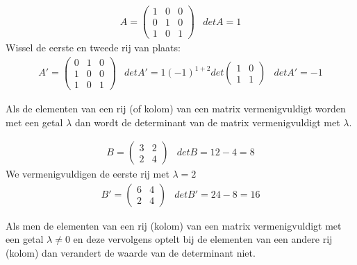 	
	\begin{voorbeeld}
		
	\[ \begin{array}{ll} A=\left( \begin{matrix}
	1 & 0 & 0 \\ 0 & 1 & 0 \\ 1 & 0 & 1
	\end{matrix} \right) & det A = 1 \end{array} \]
	Wissel de eerste en tweede rij van plaats:
	\[ \begin{array}{lll} A'=\left( \begin{matrix}
	0 & 1 & 0 \\ 1 & 0 & 0 \\ 1 & 0 & 1
	\end{matrix} \right) & det A'=1(-1)^{1+2}det \left( \begin{matrix} 1 & 0 \\ 1 & 1 \end{matrix} \right) & det A'=-1 \end{array} \]
	
	\end{voorbeeld}
\begin{eigenschap}
		Als de elementen van een rij (of kolom) van een matrix vermenigvuldigt worden met een getal $\lambda$ dan wordt de determinant van de matrix vermenigvuldigt met $\lambda$.
	\end{eigenschap}
	

	\begin{voorbeeld}
		
	\[ \begin{array}{ll} B=\left( \begin{matrix}
	3 & 2 \\ 2 & 4 
	\end{matrix} \right) & det B=12-4=8 \end{array} \]
	We vermenigvuldigen de eerste rij met $\lambda=2$
	\[ \begin{array}{ll} B'=\left( \begin{matrix}
	6 & 4 \\ 2 & 4
	\end{matrix} \right) & det B'=24-8=16 \end{array} \]
	
	\end{voorbeeld}

\begin{eigenschap}
		Als men de elementen van een rij (kolom) van een matrix vermenigvuldigt met een getal $\lambda \neq 0$ en deze vervolgens optelt bij de elementen van een andere rij (kolom) dan verandert de waarde van de determinant niet. 
	
	\end{eigenschap}
	
